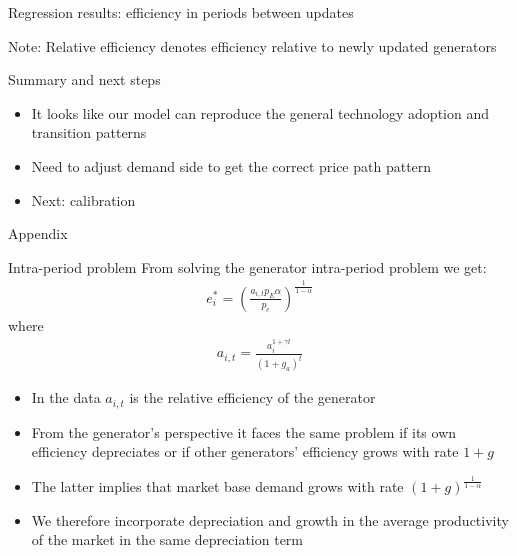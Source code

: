 \documentclass{beamer}
\begin{document}

\begin{frame}{Regression results: efficiency in periods between updates}\label{effic_between_1gen}
\scriptsize
\begin{table}
\centering
\caption{Relative efficiency in periods between updates regressed on covariates}

\end{table}
\scriptsize{Note: Relative efficiency denotes efficiency relative to newly updated generators}

\hyperlink{effic_between_all}{}

\end{frame}

\begin{frame}{Summary and next steps}
\begin{itemize}
    \item It looks like our model can reproduce the general technology adoption and transition patterns
    \item Need to adjust demand side to get the correct price path pattern
    \item Next: calibration 
\end{itemize}

\end{frame}


\appendix
\begin{frame}{Appendix}

\end{frame}


\begin{frame}{Intra-period problem}\label{intra_period}
\small
    From solving the generator intra-period problem we get:\\
    \begin{align*}
        e_i^* = (\frac{a_{i,t}p_E\alpha}{p_e})^\frac{1}{1-\alpha}
    \end{align*}
    where \begin{align*}
        a_{i,t}=\frac{a_{i}^{1+\gamma t}}{(1+g_a)^t}
    \end{align*}
    \begin{itemize} 
        \item In the data $a_{i,t}$ is the relative efficiency of the generator
        \item From the generator's perspective it faces the same problem if its own efficiency depreciates or if other generators' efficiency grows with rate $1+g$  
        \item The latter implies that market base demand grows with rate $(1+g)^\frac{1}{1-\alpha}$
        \item We therefore incorporate depreciation and growth in the average productivity of the market in the same depreciation term
    \end{itemize}
    
 \hyperlink{gen_problem}{}    
\end{frame}
\end{document}

